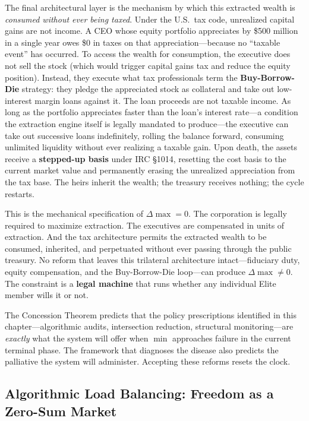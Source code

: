 The final architectural layer is the mechanism by which this extracted wealth is \textit{consumed without ever being taxed}. Under the U.S.\ tax code, unrealized capital gains are not income. A CEO whose equity portfolio appreciates by \$500 million in a single year owes \$0 in taxes on that appreciation---because no ``taxable event'' has occurred. To access the wealth for consumption, the executive does not sell the stock (which would trigger capital gains tax and reduce the equity position). Instead, they execute what tax professionals term the \textbf{Buy-Borrow-Die} strategy: they pledge the appreciated stock as collateral and take out low-interest margin loans against it. The loan proceeds are not taxable income. As long as the portfolio appreciates faster than the loan's interest rate---a condition the extraction engine itself is legally mandated to produce---the executive can take out successive loans indefinitely, rolling the balance forward, consuming unlimited liquidity without ever realizing a taxable gain. Upon death, the assets receive a \textbf{stepped-up basis} under IRC \S 1014, resetting the cost basis to the current market value and permanently erasing the unrealized appreciation from the tax base. The heirs inherit the wealth; the treasury receives nothing; the cycle restarts.

This is the mechanical specification of $\Delta\max = 0$. The corporation is legally required to maximize extraction. The executives are compensated in units of extraction. And the tax architecture permits the extracted wealth to be consumed, inherited, and perpetuated without ever passing through the public treasury. No reform that leaves this trilateral architecture intact---fiduciary duty, equity compensation, and the Buy-Borrow-Die loop---can produce $\Delta\max \neq 0$. The constraint is a \textbf{legal machine} that runs whether any individual Elite member wills it or not.

The Concession Theorem predicts that the policy prescriptions identified in this chapter---algorithmic audits, intersection reduction, structural monitoring---are \textit{exactly} what the system will offer when $\min$ approaches failure in the current terminal phase. The framework that diagnoses the disease also predicts the palliative the system will administer. Accepting these reforms resets the clock.

\subsection{Algorithmic Load Balancing: Freedom as a Zero-Sum Market}

